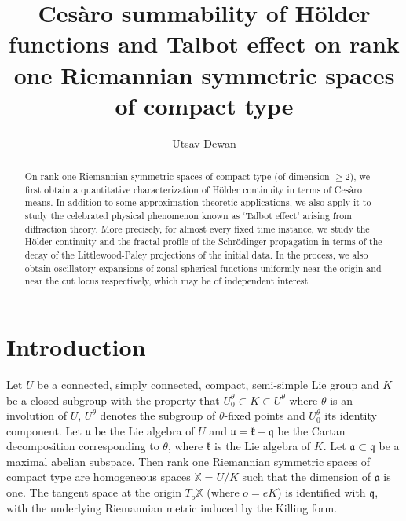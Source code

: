 \documentclass[12pt]{amsart}
\theoremstyle{definition}
\newcommand{\X}{\mathbb X}%
\numberwithin{equation}{section}
\begin{document}
\title[Ces\`aro summability and Talbot effect]{Ces\`aro summability of H\"older functions and Talbot effect on rank one Riemannian symmetric spaces of compact type }

\author[Utsav Dewan]{Utsav Dewan}
\address{Department of Mathematics, Indian Institute of Technology Bombay, Powai, Mumbai-400076, India}





\begin{abstract}
On rank one Riemannian symmetric spaces of compact type (of dimension $\ge 2$), we first obtain a quantitative characterization of H\"older continuity in terms of Ces\`aro means. In addition to some approximation theoretic applications, we also apply it to study the celebrated physical phenomenon known as `Talbot effect' arising from diffraction theory. More precisely, for almost every fixed time instance, we study the H\"older continuity and the fractal profile of the Schr\"odinger propagation in terms of the decay of the Littlewood-Paley projections of the initial data. In the process, we also obtain oscillatory expansions of zonal spherical functions uniformly near the origin and near the cut locus respectively, which may be of independent interest.
\end{abstract}

\maketitle
\tableofcontents

\section{Introduction}
\label{sec1}
Let $U$ be a connected, simply connected, compact, semi-simple Lie group and $K$ be a closed subgroup with the property that $U^\theta_0 \subset K \subset U^\theta$ where $\theta$ is an involution of $U$, $U^\theta$ denotes the subgroup of $\theta$-fixed points and $U^\theta_0$ its identity component. Let $\mathfrak{u}$ be the Lie algebra of $U$ and $\mathfrak{u}=\mathfrak{k}+\mathfrak{q}$ be the Cartan decomposition corresponding to $\theta$, where $\mathfrak{k}$ is the Lie algebra of $K$. Let $\mathfrak{a} \subset \mathfrak{q}$ be a maximal abelian subspace. Then rank one Riemannian symmetric spaces of compact type are homogeneous spaces $\X=U/K$ such that the dimension of $\mathfrak{a}$ is one. The tangent space at the origin $T_o\X$ (where $o=eK$) is identified with $\mathfrak{q}$, with the underlying Riemannian metric induced by the Killing form. 
\end{document}

